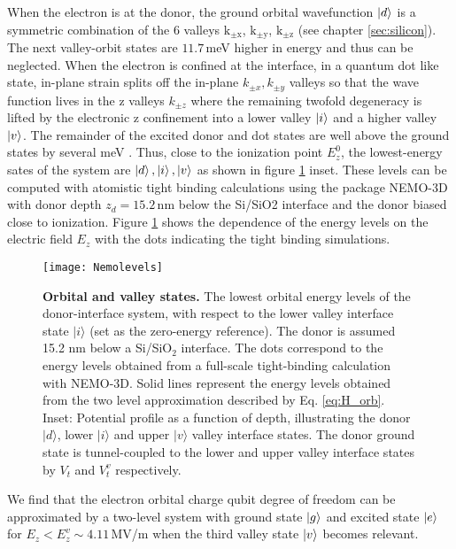 When the electron is at the donor, the ground orbital wavefunction $\ket{d}$ is a symmetric combination of the 6 valleys $\mathrm{k_{\pm x}}$, $\mathrm{k_{\pm y}} $, $\mathrm{k_{\pm z}} $ (see chapter \ref{sec:silicon}). The next valley-orbit states are $11.7\,$meV higher in energy and thus can be neglected. When the electron is confined at the interface, in a quantum dot like state, in-plane strain splits off the in-plane $k_{\pm x}, k_{\pm y}$ valleys so that the wave function lives in the z valleys $k_{\pm z}$ where the remaining twofold degeneracy is lifted by the electronic z confinement into a lower valley $\ket{i}$ and a higher valley $\ket{v}$. The remainder of the excited donor and dot states are well above the ground states by several meV \cite{Rahman2009, Calderon2009}. Thus, close to the ionization point $E_z^0$, the lowest-energy sates of the system are $\ket{d}, \ket{i}, \ket{v}$ as shown in figure \ref{fig:nemolevels} inset. 
These levels can be computed with atomistic tight binding calculations using the package NEMO-3D \cite{Klimeck2007a, Klimeck2007b} with donor depth $z_d=15.2\,$nm below the Si/SiO2 interface and the donor biased close to ionization. Figure \ref{fig:nemolevels} shows the dependence of the energy levels on the electric field $E_z$ with the dots indicating the tight binding simulations. 

\begin{figure}[h]
	\centering
	\texttt{[image: Nemolevels]}
	\caption[Orbital and valley states]{\textbf{Orbital and valley states.} The lowest orbital energy levels of the donor-interface system, with respect to the lower valley interface state $\lvert i \rangle$ (set as the zero-energy reference). The donor is assumed 15.2 nm below a Si/SiO$_2$ interface. The dots correspond to the energy levels obtained from a full-scale tight-binding calculation with NEMO-3D. Solid lines represent the energy levels obtained from the two level approximation described by Eq. \ref{eq:H_orb}. Inset: Potential profile as a function of depth, illustrating the donor $\lvert d \rangle$, lower $\lvert i \rangle$ and upper $\lvert v \rangle$ valley interface states. The donor ground state is tunnel-coupled to the lower and upper valley interface states by $V_t$ and $V_t^v$  respectively.}
	\label{fig:nemolevels}
\end{figure}

We find that the electron orbital charge qubit degree of freedom can be approximated by a two-level system with ground state $\ket{g}$ and excited state $\ket{e}$ for $E_z<E_z^v\sim 4.11\,$MV/m when the third valley state $\ket{v}$ becomes relevant. 

